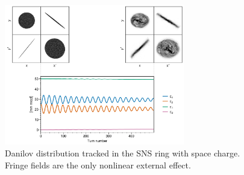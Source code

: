 \begin{figure}[!p]
    \centering
    \includegraphics[width=0.7\textwidth]{Images/chapter3/fringe_spacecharge.png}
    \caption{Danilov distribution tracked in the SNS ring with space charge. Fringe fields are the only nonlinear external effect.}
    \label{fig:fringe_c}
    \vspace*{3cm}
\end{figure}